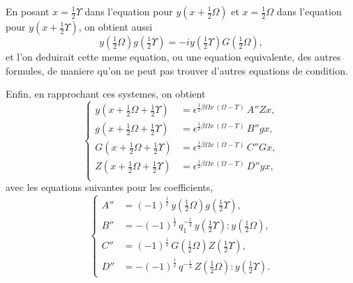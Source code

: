 \documentclass[11pt,a4paper]{article}
\begin{document}
En posant $x = \frac{1}{2}\Upsilon$ dans l'equation pour $y\left(x + \frac{1}{2}\Omega\right)$ et $x = \frac{1}{2}\Omega$ dans l'equation pour
$y\left(x + \frac{1}{2}\Upsilon\right)$, on obtient aussi
\begin{equation}
y\left(\tfrac{1}{2}\Omega\right) g\left(\tfrac{1}{2}\Upsilon\right) = -iy\left(\tfrac{1}{2}\Upsilon\right) G\left(\tfrac{1}{2}\Omega\right), \tag{28}
\end{equation}
et l'on deduirait cette meme equation, ou une equation equivalente, des autres
formules, de maniere qu'on ne peut pas trouver d'autres equations de condition.

Enfin, en rapprochant ces systemes, on obtient
\begin{equation}
\left\{
\begin{aligned}
y\left(x + \tfrac{1}{2}\Omega + \tfrac{1}{2}\Upsilon\right) &= \epsilon^{\frac{1}{2}\beta\Omega x\, (\Omega - \Upsilon)}\, A''Zx,\\
g\left(x + \tfrac{1}{2}\Omega + \tfrac{1}{2}\Upsilon\right) &= \epsilon^{\frac{1}{2}\beta\Omega x\, (\Omega - \Upsilon)}\, B''gx,\\
G\left(x + \tfrac{1}{2}\Omega + \tfrac{1}{2}\Upsilon\right) &= \epsilon^{\frac{1}{2}\beta\Omega x\, (\Omega - \Upsilon)}\, C''Gx,\\
Z\left(x + \tfrac{1}{2}\Omega + \tfrac{1}{2}\Upsilon\right) &= \epsilon^{\frac{1}{2}\beta\Omega x\, (\Omega - \Upsilon)}\, D''yx,\\
\end{aligned}
\right. \tag{29}
\end{equation}
avec les equations suivantes pour les coefficients,
\begin{equation}
\left\{
\begin{aligned}
A'' &= (-1)^{\frac{1}{2}}\, y\left(\tfrac{1}{2}\Omega\right) g\left(\tfrac{1}{2}\Upsilon\right),\\
B'' &= -(-1)^{\frac{1}{2}}\, q_1^{-\frac{1}{4}}\, y\left(\tfrac{1}{2}\Upsilon\right) : y\left(\tfrac{1}{2}\Omega\right),\\
C'' &= (-1)^{\frac{1}{2}}\, G\left(\tfrac{1}{2}\Omega\right) Z\left(\tfrac{1}{2}\Upsilon\right),\\
D'' &= -(-1)^{\frac{1}{2}}\, q^{-\frac{1}{4}}\, Z\left(\tfrac{1}{2}\Omega\right) : y\left(\tfrac{1}{2}\Upsilon\right).
\end{aligned}
\right. \tag{30}
\end{equation}
\end{document}
